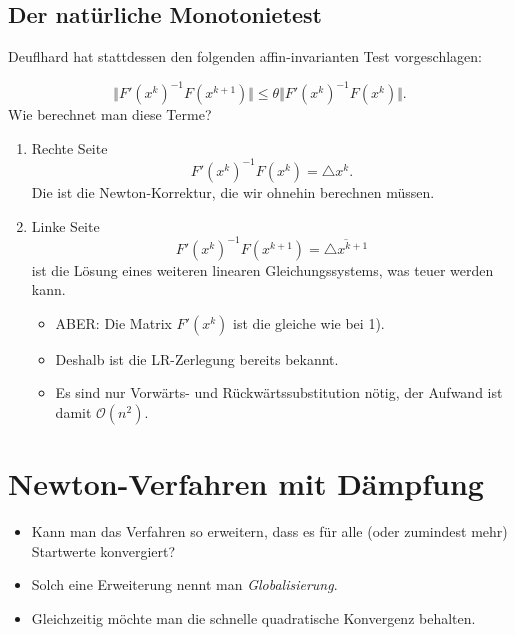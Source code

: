 \subsection{Der natürliche Monotonietest}

Deuflhard hat stattdessen den folgenden affin-invarianten Test vorgeschlagen:

\begin{equation*}
 \big\Vert F' (x^k )^{-1}F (x^{k+1} ) \big\Vert \leq \theta \big\Vert F' (x^k )^{-1}F (x^k ) \big\Vert.
\end{equation*}
Wie berechnet man diese Terme?

\begin{enumerate}
 \item  Rechte Seite
   \begin{equation*}
    F' (x^k )^{-1}F (x^k )=\triangle x^k.
   \end{equation*}
   Die ist die Newton-Korrektur, die wir ohnehin berechnen müssen.

 \item
   Linke Seite
   \begin{equation*}
    F' (x^k )^{-1}F (x^{k+1} )=\overline{\triangle x^{k+1}}
   \end{equation*}
   ist die Lösung eines weiteren linearen Gleichungssystems, was teuer werden kann.
   \begin{itemize}
    \item ABER: Die Matrix $F' (x^k )$ ist die gleiche wie bei 1).
    \item Deshalb ist die LR-Zerlegung bereits bekannt.
    \item Es sind nur Vorwärts- und Rückwärtssubstitution nötig, der Aufwand ist damit $\mathcal{O} (n^2 )$.
   \end{itemize}
\end{enumerate}

\section{Newton-Verfahren mit Dämpfung}

\begin{itemize}
 \item Kann man das Verfahren so erweitern, dass es für alle (oder zumindest mehr) Startwerte konvergiert?
 \item Solch eine Erweiterung nennt man \emph{Globalisierung}.
 \item Gleichzeitig möchte man die schnelle quadratische Konvergenz behalten.
\end{itemize}

